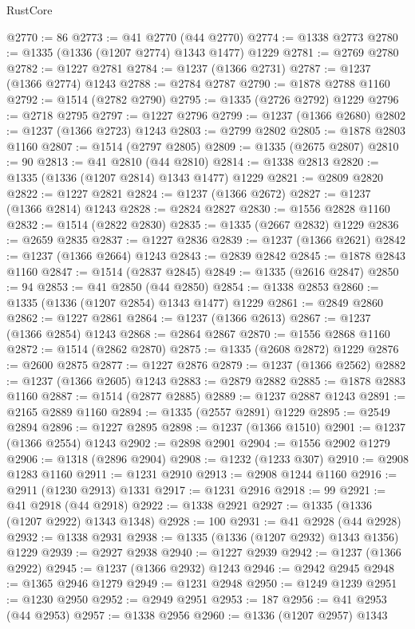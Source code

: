 \begin{lexlean}{RustCore}
\begin{coremodule}
@2770 := 86
@2773 := @41 @2770 (@44 @2770)
@2774 := @1338 @2773
@2780 := @1335 (@1336 (@1207 @2774) @1343 @1477) @1229
@2781 := @2769 @2780
@2782 := @1227 @2781
@2784 := @1237 (@1366 @2731)
@2787 := @1237 (@1366 @2774) @1243
@2788 := @2784 @2787
@2790 := @1878 @2788 @1160
@2792 := @1514 (@2782 @2790)
@2795 := @1335 (@2726 @2792) @1229
@2796 := @2718 @2795
@2797 := @1227 @2796
@2799 := @1237 (@1366 @2680)
@2802 := @1237 (@1366 @2723) @1243
@2803 := @2799 @2802
@2805 := @1878 @2803 @1160
@2807 := @1514 (@2797 @2805)
@2809 := @1335 (@2675 @2807)
@2810 := 90
@2813 := @41 @2810 (@44 @2810)
@2814 := @1338 @2813
@2820 := @1335 (@1336 (@1207 @2814) @1343 @1477) @1229
@2821 := @2809 @2820
@2822 := @1227 @2821
@2824 := @1237 (@1366 @2672)
@2827 := @1237 (@1366 @2814) @1243
@2828 := @2824 @2827
@2830 := @1556 @2828 @1160
@2832 := @1514 (@2822 @2830)
@2835 := @1335 (@2667 @2832) @1229
@2836 := @2659 @2835
@2837 := @1227 @2836
@2839 := @1237 (@1366 @2621)
@2842 := @1237 (@1366 @2664) @1243
@2843 := @2839 @2842
@2845 := @1878 @2843 @1160
@2847 := @1514 (@2837 @2845)
@2849 := @1335 (@2616 @2847)
@2850 := 94
@2853 := @41 @2850 (@44 @2850)
@2854 := @1338 @2853
@2860 := @1335 (@1336 (@1207 @2854) @1343 @1477) @1229
@2861 := @2849 @2860
@2862 := @1227 @2861
@2864 := @1237 (@1366 @2613)
@2867 := @1237 (@1366 @2854) @1243
@2868 := @2864 @2867
@2870 := @1556 @2868 @1160
@2872 := @1514 (@2862 @2870)
@2875 := @1335 (@2608 @2872) @1229
@2876 := @2600 @2875
@2877 := @1227 @2876
@2879 := @1237 (@1366 @2562)
@2882 := @1237 (@1366 @2605) @1243
@2883 := @2879 @2882
@2885 := @1878 @2883 @1160
@2887 := @1514 (@2877 @2885)
@2889 := @1237 @2887 @1243
@2891 := @2165 @2889 @1160
@2894 := @1335 (@2557 @2891) @1229
@2895 := @2549 @2894
@2896 := @1227 @2895
@2898 := @1237 (@1366 @1510)
@2901 := @1237 (@1366 @2554) @1243
@2902 := @2898 @2901
@2904 := @1556 @2902 @1279
@2906 := @1318 (@2896 @2904)
@2908 := @1232 (@1233 @307)
@2910 := @2908 @1283 @1160
@2911 := @1231 @2910
@2913 := @2908 @1244 @1160
@2916 := @2911 (@1230 @2913) @1331
@2917 := @1231 @2916
@2918 := 99
@2921 := @41 @2918 (@44 @2918)
@2922 := @1338 @2921
@2927 := @1335 (@1336 (@1207 @2922) @1343 @1348)
@2928 := 100
@2931 := @41 @2928 (@44 @2928)
@2932 := @1338 @2931
@2938 := @1335 (@1336 (@1207 @2932) @1343 @1356) @1229
@2939 := @2927 @2938
@2940 := @1227 @2939
@2942 := @1237 (@1366 @2922)
@2945 := @1237 (@1366 @2932) @1243
@2946 := @2942 @2945
@2948 := @1365 @2946 @1279
@2949 := @1231 @2948
@2950 := @1249 @1239
@2951 := @1230 @2950
@2952 := @2949 @2951
@2953 := 187
@2956 := @41 @2953 (@44 @2953)
@2957 := @1338 @2956
@2960 := @1336 (@1207 @2957) @1343

\end{coremodule}
\end{lexlean}
